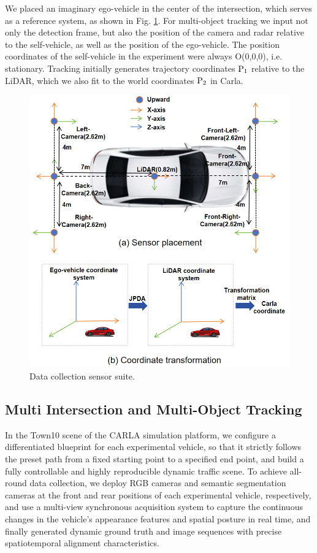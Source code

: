 \documentclass[lettersize,journal]{IEEEtran}
\begin{document}
We placed an imaginary ego-vehicle in the center of the intersection, which serves as a reference system, as shown in Fig. \ref{fig:3}. 
For multi-object tracking we input not only the detection frame, but also the position of the camera and radar relative to the self-vehicle, as well as the position of the ego-vehicle. 
The position coordinates of the self-vehicle in the experiment were always O(0,0,0), i.e. stationary. 
Tracking initially generates trajectory coordinates \(\text P_1\) relative to the LiDAR, which we also fit to the world coordinates \(\text P_2\) in Carla.
\begin{figure}[t]
	\centering
	\includegraphics[width=\linewidth]{picture/picture3.png} 
	\caption{Data collection sensor suite.} 
	\label{fig:3} 
\end{figure}

\subsection{Multi Intersection and Multi-Object Tracking}

In the Town10 scene of the CARLA simulation platform, we configure a differentiated blueprint for each experimental vehicle, so that it strictly follows the preset path from a fixed starting point to a specified end point, and build a fully controllable and highly reproducible dynamic traffic scene.
To achieve all-round data collection, we deploy RGB cameras and semantic segmentation cameras at the front and rear positions of each experimental vehicle, respectively, and use a multi-view synchronous acquisition system to capture the continuous changes in the vehicle's appearance features and spatial posture in real time, and finally generated dynamic ground truth and image sequences with precise spatiotemporal alignment characteristics.
\end{document}
